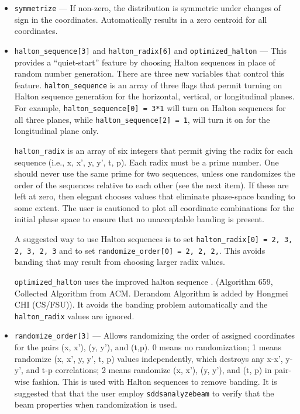 \documentclass[11pt]{article}
\begin{document}
\begin{itemize}
\item \verb|symmetrize| --- If non-zero, the distribution is symmetric
under changes of sign in the coordinates.  Automatically results in a
zero centroid for all coordinates.

\item \verb|halton_sequence[3]| and \verb|halton_radix[6]| and \verb|optimized_halton|
--- This provides a ``quiet-start'' feature by choosing Halton sequences in
place of random number generation.  There are three new variables that
control this feature.  \verb|halton_sequence| is an array of three
flags that permit turning on Halton sequence generation for the
horizontal, vertical, or longitudinal planes.  For example,
\verb|halton_sequence[0] = 3*1| will turn on Halton sequences for all
three planes, while \verb|halton_sequence[2] = 1|, will turn it on for
the longitudinal plane only.

\verb|halton_radix| is an array of six integers that permit giving the
radix for each sequence (i.e., x, x', y, y', t, p).  Each radix must
be a prime number.  One should never use the same prime for two
sequences, unless one randomizes the order of the sequences relative to
each other (see the next item).  If these are left at zero, then
elegant chooses values that eliminate phase-space banding to some
extent.  The user is cautioned to plot all coordinate combinations for
the initial phase space to ensure that no unacceptable banding is
present.

A suggested way to use Halton sequences is to set
\verb|halton_radix[0] = 2, 3, 2, 3, 2, 3| and
to set 
\verb|randomize_order[0] = 2, 2, 2,|.  This avoids banding that may
result from choosing larger radix values.

\verb|optimized_halton| uses the improved halton sequence \cite{Chi2005}.
(Algorithm 659, Collected Algorithm from ACM. Derandom Algorithm is added
by Hongmei CHI (CS/FSU)). It avoids the banding problem automatically and
the \verb|halton_radix| values are ignored.

\item \verb|randomize_order[3]| --- Allows randomizing the order of
assigned coordinates for the pairs (x, x'), (y, y'), and (t,p).  0
means no randomization; 1 means randomize (x, x', y, y', t, p) values
independently, which destroys any x-x', y-y', and t-p correlations; 2
means randomize (x, x'), (y, y'), and (t, p) in pair-wise fashion.
This is used with Halton sequences to remove banding.  It is suggested
that that the user employ \verb|sddsanalyzebeam| to verify that the
beam properties when randomization is used.


\end{itemize}
\end{document}
